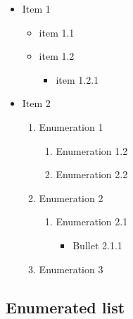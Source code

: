 \documentclass{extarticle}
\begin{document}
\begin{itemize}

\item Item 1

\begin{itemize}

\item item 1.1

\item item 1.2

\begin{itemize}

\item item 1.2.1

\end{itemize}

\end{itemize}

\item Item 2

\begin{enumerate}

\item Enumeration 1

\begin{enumerate}

\item Enumeration 1.2

\item Enumeration 2.2

\end{enumerate}

\item Enumeration 2

\begin{enumerate}

\item Enumeration 2.1

\begin{itemize}

\item Bullet 2.1.1

\end{itemize}

\end{enumerate}

\item Enumeration 3

\end{enumerate}

\end{itemize}



\subsection{Enumerated list}
\end{document}
